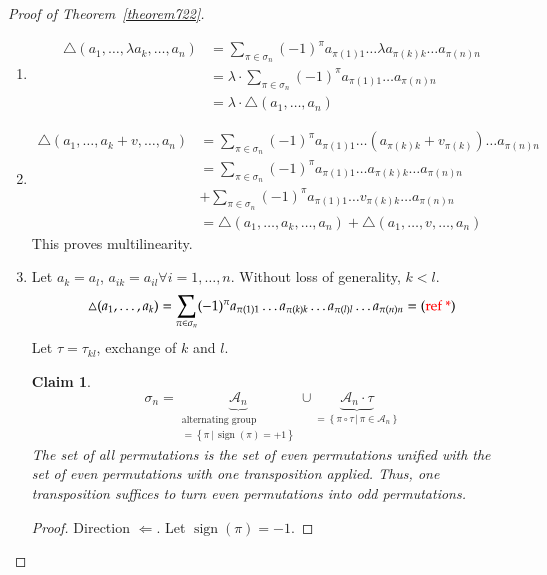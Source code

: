 \documentclass{article}
\newtheorem*{claim}{Claim}%
\newcommand{\setdef}[2]{\left\{\left.#1\,\right|\,#2\right\}}
\DeclareMathOperator{\sign}{sign}
\begin{document}
\begin{proof}[Proof of Theorem~\ref{theorem722}]
  \begin{enumerate}
    \item
      \begin{align*}
        \triangle(a_1, \dots, \lambda a_k, \dots, a_n)
          &= \sum_{\pi \in \sigma_n} (-1)^{\pi} a_{\pi(1)1} \dots \lambda a_{\pi(k) k} \dots a_{\pi(n) n} \\
          &= \lambda \cdot \sum_{\pi \in \sigma_n} (-1)^\pi a_{\pi(1) 1} \dots a_{\pi(n) n} \\
          &= \lambda \cdot \triangle(a_1, \dots, a_n)
      \end{align*}
    \item
      \begin{align*}
        \triangle(a_1, \dots, a_k + v, \dots, a_n)
          &= \sum_{\pi \in \sigma_n} (-1)^\pi a_{\pi(1) 1} \dots (a_{\pi(k) k} + v_{\pi(k)}) \dots a_{\pi(n) n} \\
          &= \sum_{\pi \in \sigma_n} (-1)^\pi a_{\pi(1) 1} \dots a_{\pi(k) k} \dots a_{\pi(n) n} \\
          &+ \sum_{\pi \in \sigma_n} (-1)^\pi a_{\pi(1) 1} \dots v_{\pi(k) k} \dots a_{\pi(n) n} \\
          &= \triangle(a_1, \dots, a_k, \dots, a_n) + \triangle(a_1, \dots, v, \dots, a_n)
      \end{align*}
      This proves multilinearity.
    \item
      Let $a_k = a_l$, $a_{ik} = a_{il} \forall i = 1, \dots, n$.
      Without loss of generality, $k < l$.
      \[ \triangle(a_1, \dots, a_k) = \sum_{\pi \in \sigma_n} (-1)^\pi a_{\pi(1) 1} \dots a_{\pi(k) k} \dots a_{\pi(l) l} \dots a_{\pi(n) n} = (\text{\color{red} ref *}) \]
      Let $\tau = \tau_{kl}$, exchange of $k$ and $l$.
      \begin{claim}
        \[ \sigma_n = \underbrace{\mathcal A_n}_{\substack{\text{alternating group} \\ = \setdef{\pi}{\sign(\pi) = +1}}} \cup \underbrace{\mathcal A_{n} \cdot \tau}_{= \setdef{\pi \circ \tau}{\pi \in \mathcal A_n}} \]
        The set of all permutations is the set of even permutations unified with the set of even permutations with one transposition applied. Thus, one transposition suffices to turn even permutations into odd permutations.
      \end{claim}
      \begin{proof}
        Direction $\Leftarrow$.
        Let $\sign(\pi) = -1$.

\end{proof}
\end{enumerate}
\end{proof}
\end{document}

